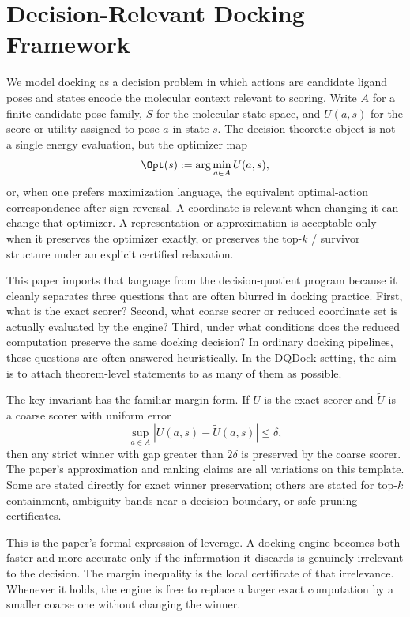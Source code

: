 \section{Decision-Relevant Docking Framework}\label{sec:framework}

We model docking as a decision problem in which actions are candidate ligand poses and states encode the molecular context relevant to scoring. Write $A$ for a finite candidate pose family, $S$ for the molecular state space, and $U(a,s)$ for the score or utility assigned to pose $a$ in state $s$. The decision-theoretic object is not a single energy evaluation, but the optimizer map
\[
\Opt(s) := \arg\min_{a \in A} U(a,s),
\]
or, when one prefers maximization language, the equivalent optimal-action correspondence after sign reversal. A coordinate is relevant when changing it can change that optimizer. A representation or approximation is acceptable only when it preserves the optimizer exactly, or preserves the top-$k$ / survivor structure under an explicit certified relaxation.

This paper imports that language from the decision-quotient program because it cleanly separates three questions that are often blurred in docking practice. First, what is the exact scorer? Second, what coarse scorer or reduced coordinate set is actually evaluated by the engine? Third, under what conditions does the reduced computation preserve the same docking decision? In ordinary docking pipelines, these questions are often answered heuristically. In the DQDock setting, the aim is to attach theorem-level statements to as many of them as possible.

The key invariant has the familiar margin form. If $U$ is the exact scorer and $\widetilde U$ is a coarse scorer with uniform error
\[
\sup_{a \in A} |U(a,s) - \widetilde U(a,s)| \leq \delta,
\]
then any strict winner with gap greater than $2\delta$ is preserved by the coarse scorer. The paper's approximation and ranking claims are all variations on this template. Some are stated directly for exact winner preservation; others are stated for top-$k$ containment, ambiguity bands near a decision boundary, or safe pruning certificates.

This is the paper's formal expression of leverage. A docking engine becomes both faster and more accurate only if the information it discards is genuinely irrelevant to the decision. The margin inequality is the local certificate of that irrelevance. Whenever it holds, the engine is free to replace a larger exact computation by a smaller coarse one without changing the winner.

